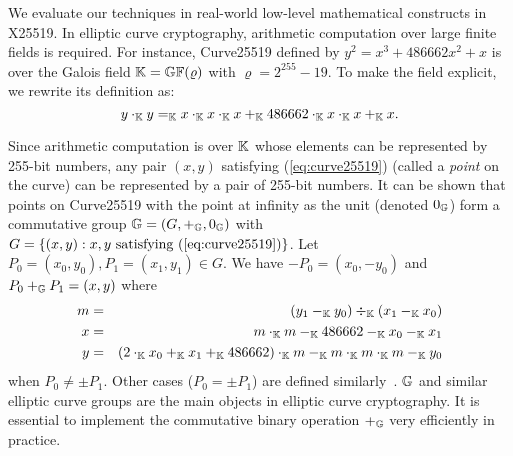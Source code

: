 
We evaluate our techniques in real-world low-level mathematical
constructs in X25519. 
In elliptic curve cryptography, arithmetic computation over
large finite fields is required. For
instance, Curve25519 defined by $y^2 = x^3 + 486662 x^2 + x$ 
is over the Galois field $\mathbb{K} = \mathbb{GF}(\varrho)$ with
$\varrho = 2^{255} - 19$. To
make the field explicit, we rewrite its definition as:
\vspace{-.5em}
\begin{equation}
  \label{eq:curve25519}
  y \cdot_{\mathbb{K}} y =_{\mathbb{K}} x \cdot_{\mathbb{K}} x \cdot_{\mathbb{K}} x +_{\mathbb{K}}
  486662 \cdot_{\mathbb{K}} x \cdot_{\mathbb{K}} x +_{\mathbb{K}} x.
\end{equation}

Since arithmetic computation is over $\mathbb{K}$ whose
elements can be represented by 255-bit numbers,
any pair $(x, y)$ satisfying (\ref{eq:curve25519}) (called a
\emph{point} on the curve) can be represented by a pair of 255-bit
numbers. It can be shown that points on Curve25519 with the point at
infinity as the unit (denoted $0_{\mathbb{G}}$) form a commutative group $\mathbb{G} = (G, +_{\mathbb{G}}, 0_{\mathbb{G}})$
with $G = \{ (x, y) : x, y \textmd{ satisfying } (\ref{eq:curve25519})
\}$. Let $P_0 = (x_0, y_0), P_1 = (x_1, y_1) \in G$. We have $-P_0 =
(x_0, -y_0)$ and $P_0 +_{\mathbb{G}} P_1 = (x, y)$  where
\vspace{-.5em}
\begin{eqnarray}
  m & = & (y_1 \Fminus y_0) \Fdiv (x_1 \Fminus x_0)\\\nonumber
  x & = & m \Ftimes m \Fminus 486662 \Fminus x_0 \Fminus x_1\\ \nonumber
  y & = & %
          (2 \Ftimes x_0 \Fplus x_1 \Fplus 486662 )\Ftimes m
          \Fminus m \Ftimes m \Ftimes m\Fminus y_0
  \label{eq:curve25519-group}
\end{eqnarray}
when $P_0 \neq \pm P_1$. Other cases ($P_0 = \pm P_1$) are defined
similarly~\cite{C:96:CCANT}.
$\mathbb{G}$ and similar elliptic curve groups
are the main objects in elliptic curve cryptography. It is
essential to implement the commutative binary operation $+_{\mathbb{G}}$ very
efficiently in practice.

